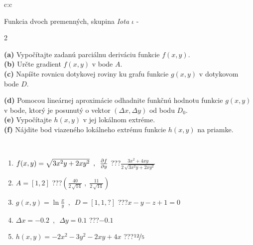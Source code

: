 \documentclass[10pt]{report}
\begin{document}
\begin{tabular}{c:c}
\begin{minipage}[c][104.5mm][t]{0.5\linewidth}
\begin{center}
\vspace{7mm}
{\huge \LARGE Funkcia dvoch premenných, skupina \textit{Iota $\iota$} -}\\[5mm]
\begin{minipage}{0.95\linewidth}
\begin{center}
{\small \begin{multicols}{2} \raggedright
\textbf{(a)} Vypočítajte zadanú parciálnu deriváciu funkcie \(f(x,y)\). \\[1mm]
\textbf{(b)} Určte gradient \(f(x,y)\) v bode \(A\). \\[1mm]
\textbf{(c)} Napíšte rovnicu dotykovej roviny ku grafu funkcie \(g(x,y)\) v dotykovom bode \(D\). \par \columnbreak
\textbf{(d)} Pomocou lineárnej aproximácie odhadnite funkčnú hodnotu funkcie \(g(x,y)\) v bode, ktorý je posunutý o vektor \((\Delta x, \Delta y)\) od bodu \(D_0\). \\[1mm]
\textbf{(e)} Vypočítajte \(h(x,y)\) v jej lokálnom extréme. \\[1mm]
\textbf{(f)} Nájdite bod viazeného lokálneho extrému funkcie \(h(x,y)\) na priamke. \\[1mm]
\end{multicols}
}
\end{center}
\end{minipage}
\\[4mm]
\begin{minipage}{0.79\linewidth}
\begin{center}
\begin{varwidth}{\linewidth}
\begin{enumerate}
\normalsizerr
\item $f(x,y) = \sqrt{3x^2y + 2xy^2}\enspace , \enspace \pdv{f}{y}$\quad \dotfill\; ???\;\dotfill \quad $\frac{3x^2+4xy}{2\,\sqrt{3x^2y+2xy^2}}$
\item $A = [1, 2]$\quad \dotfill\; ???\;\dotfill \quad $\left( \frac{40}{2\,\sqrt{14}} \;,\; \frac{11}{2\,\sqrt{14}} \right)$
\item $g(x,y) = \ln\frac{x}{y} \enspace , \enspace D=[1,1,?]$\quad \dotfill\; ???\;\dotfill \quad $x - y - z + 1 = 0$
\item $\Delta x = {-0.2} \enspace,\enspace \Delta y = {0.1}$\quad \dotfill\; ???\;\dotfill \quad $-0.1$
\item $h(x,y) = -2x^2-3y^2-2xy+4x$\quad \dotfill\; ???\;\dotfill \quad $\nicefrac{12}{5}$

\end{enumerate}
\end{varwidth}
\end{center}
\end{minipage}
\end{center}
\end{minipage}
\end{tabular}
\end{document}

